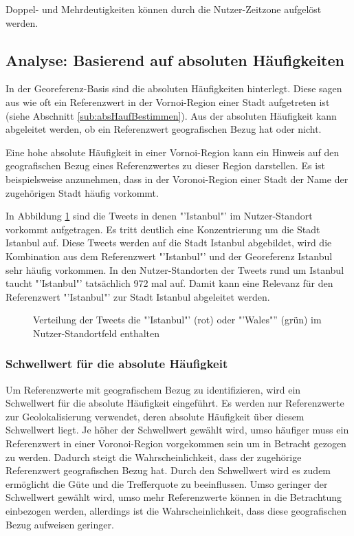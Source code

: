 			Doppel- und Mehrdeutigkeiten können durch die Nutzer-Zeitzone aufgelöst werden. 
			
		\subsection{Analyse: Basierend auf absoluten Häufigkeiten} 

			In der Georeferenz-Basis sind die absoluten Häufigkeiten hinterlegt.
			Diese sagen aus wie oft ein Referenzwert in der Vornoi-Region einer Stadt aufgetreten ist (siehe Abschnitt \ref{sub:absHaufBestimmen}). 
			Aus der absoluten Häufigkeit kann abgeleitet werden, ob ein Referenzwert geografischen Bezug hat oder nicht.

			Eine hohe absolute Häufigkeit in einer Vornoi-Region kann ein Hinweis auf den geografischen Bezug eines Referenzwertes zu dieser Region darstellen. 
			Es ist beispielsweise anzunehmen, dass in der Voronoi-Region einer Stadt der Name der zugehörigen Stadt häufig vorkommt.

			In Abbildung \ref{img:ulIstanbulWalesZoom} sind die Tweets in denen "'Istanbul"' im Nutzer-Standort vorkommt aufgetragen.
			Es tritt deutlich eine Konzentrierung um die Stadt Istanbul auf. 
			Diese Tweets werden auf die Stadt Istanbul abgebildet, wird die Kombination aus dem Referenzwert "'Istanbul"' und der Georeferenz Istanbul sehr häufig vorkommen.
			In den Nutzer-Standorten der Tweets rund um Istanbul taucht "'Istanbul"' tatsächlich 972 mal auf.
			Damit kann eine Relevanz für den Referenzwert "'Istanbul"' zur Stadt Istanbul abgeleitet werden.

			\begin{figure}[!ht]
					\centering
						\caption{Verteilung der Tweets die "'Istanbul"' (rot) oder "'Wales"'' (grün) im Nutzer-Standortfeld enthalten}
						\label{img:ulIstanbulWalesZoom}


			\end{figure}	


			\subsubsection{Schwellwert für die absolute Häufigkeit} 

				Um Referenzwerte mit geografischem Bezug zu identifizieren, wird ein Schwellwert für die absolute Häufigkeit eingeführt.
				Es werden nur Referenzwerte zur Geolokalisierung verwendet, deren absolute Häufigkeit über diesem Schwellwert liegt.
				Je höher der Schwellwert gewählt wird, umso häufiger muss ein Referenzwert in einer Voronoi-Region vorgekommen sein um in Betracht gezogen zu werden.
				Dadurch steigt die Wahrscheinlichkeit, dass der zugehörige Referenzwert geografischen Bezug hat. 
				Durch den Schwellwert wird es zudem ermöglicht die Güte und die Trefferquote zu beeinflussen.
				Umso geringer der Schwellwert gewählt wird, umso mehr Referenzwerte können in die Betrachtung einbezogen werden, allerdings ist die Wahrscheinlichkeit, dass diese geografischen Bezug aufweisen geringer.  

